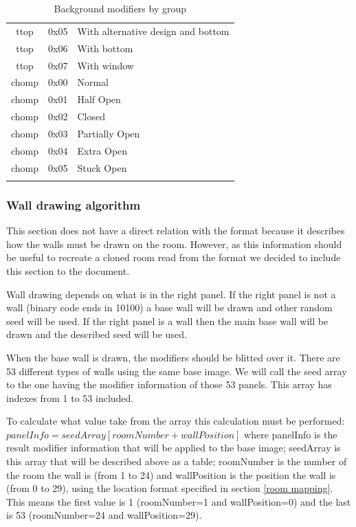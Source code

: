 \documentclass{article}
\begin{document}
\begin{longtable}{ccl}
 ttop  & 0x05 & With alternative design and bottom\footnotemark[2] \\
 ttop  & 0x06 & With bottom\footnotemark[2] \\
 ttop  & 0x07 & With window\footnotemark[2] \\
 chomp & 0x00 & Normal \\
 chomp & 0x01 & Half Open \\
 chomp & 0x02 & Closed \\
 chomp & 0x03 & Partially Open \\
 chomp & 0x04 & Extra Open \\
 chomp & 0x05 & Stuck Open \\
\hline

\caption{Background modifiers by group}
\label{background modifiers}
\end{longtable}

\subsubsection{Wall drawing algorithm} %
 This section does not have a direct relation with the format because it
 describes how the walls must be drawn on the room. However, as this
 information should be useful to recreate a cloned room read from the
 format we decided to include this section to the document.

 Wall drawing depends on what is in the right panel. If the right panel
 is not a wall (binary code ends in 10100) a base wall will be drawn and
 other random seed will be used. If the right panel is a wall then the main
 base wall will be drawn and the described seed will be used.

 When the base wall is drawn, the modifiers should be blitted over it.
 There are 53 different types of walls using the same base image.
 We will call the seed array to the one having the modifier information of
 those 53 panels. This array has indexes from 1 to 53 included.

 To calculate what value take from the array this calculation must be
 performed: $panelInfo=seedArray[roomNumber+wallPosition]$
 where panelInfo is the result modifier information that will be applied to
 the base image; seedArray is this array that will be described above as a
 table; roomNumber is the number of the room the wall is (from 1 to 24)
 and wallPosition is the position the wall is (from 0 to 29), using the
 location format specified in section \ref{room mapping}. This means the first value is
 1 (roomNumber=1 and wallPosition=0) and the last is 53 (roomNumber=24
 and wallPosition=29).
\end{document}
